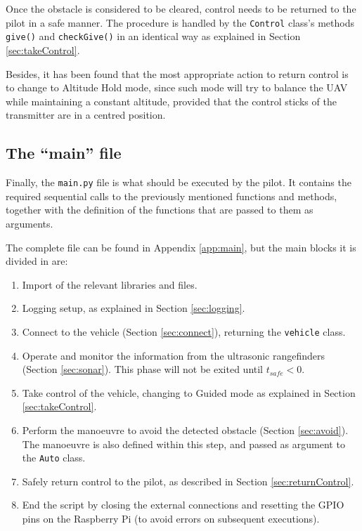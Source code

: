 Once the obstacle is considered to be cleared, control needs to be returned to the pilot in a safe manner.
The procedure is handled by the \texttt{Control} class's methods \texttt{give()} and \texttt{checkGive()} in an identical way as explained in Section \ref{sec:takeControl}.

Besides, it has been found that the most appropriate action to return control is to change to Altitude Hold mode, since such mode will try to balance the UAV while maintaining a constant altitude, provided that the control sticks of the transmitter are in a centred position.

\subsection{The ``main'' file}

Finally, the \texttt{main.py} file is what should be executed by the pilot.
It contains the required sequential calls to the previously mentioned functions and methods, together with the definition of the functions that are passed to them as arguments.

The complete file can be found in Appendix \ref{app:main}, but the main blocks it is divided in are:

\begin{enumerate}
	\item Import of the relevant libraries and files.
	\item Logging setup, as explained in Section \ref{sec:logging}.
	\item Connect to the vehicle (Section \ref{sec:connect}), returning the \texttt{vehicle} class.
	\item Operate and monitor the information from the ultrasonic rangefinders (Section \ref{sec:sonar}). This phase will not be exited until $t_{safe}<0$.
	\item Take control of the vehicle, changing to Guided mode as explained in Section \ref{sec:takeControl}.
	\item Perform the manoeuvre to avoid the detected obstacle (Section \ref{sec:avoid}). The manoeuvre is also defined within this step, and passed as argument to the \texttt{Auto} class.
	\item Safely return control to the pilot, as described in Section \ref{sec:returnControl}.
	\item End the script by closing the external connections and resetting the GPIO pins on the Raspberry Pi (to avoid errors on subsequent executions).
\end{enumerate}


